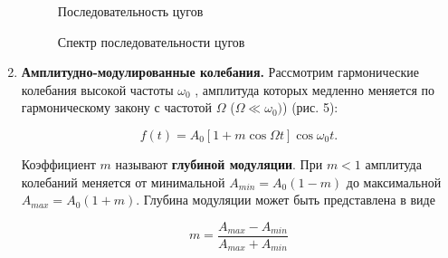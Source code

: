\documentclass[12pt,a4paper]{article}
\begin{document}
\begin{enumerate}
	\begin{figure}[h]
		\vspace{-5ex}
		\begin{minipage}[h]{0.5\linewidth}
		\caption{Последовательность цугов}
		\end{minipage}
		\begin{minipage}[h]{0.5\linewidth}
		\caption{Спектр последовательности цугов}
		\end{minipage}
	\end{figure}	
	
	\item \textbf{Амплитудно-модулированные колебания.} Рассмотрим гармонические колебания высокой частоты $\omega_{0}$ , амплитуда которых медленно меняется по гармоническому закону с частотой $\Omega$ ($\Omega \ll \omega_{0})$) (рис. 5):
	
	$$f(t)=A_{0}[1+m\cos\Omega t]\cos \omega_{0}t.$$
	
	Коэффициент $m$ называют \textbf{глубиной модуляции}. При $m<1$ амплитуда колебаний меняется от минимальной $A_{min}=A_{0}(1-m)$ до максимальной $A_{max}=A_{0}(1+m).$ Глубина модуляции может быть представлена в виде
	
\begin{equation}\label{m}
	 m=\dfrac{A_{max}-A_{min}}{A_{max}+A_{min}}
\end{equation}
	

\end{enumerate}
\end{document}

